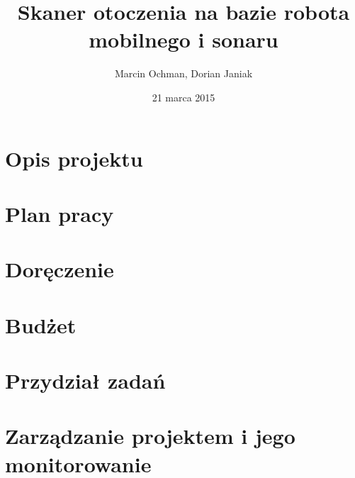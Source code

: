 \documentclass[a4paper]{article}
\begin{document}
\begin{titlepage}
   	\title{Skaner otoczenia na bazie robota mobilnego i sonaru}
	\author{Marcin Ochman, Dorian Janiak}
	\date{21 marca 2015}

\maketitle
\end{titlepage}



\section{Opis projektu}


\section{Plan pracy}


\section{Doręczenie}


\section{Budżet}


\section{Przydział zadań}


\section{Zarządzanie projektem i jego monitorowanie}

\end{document}
